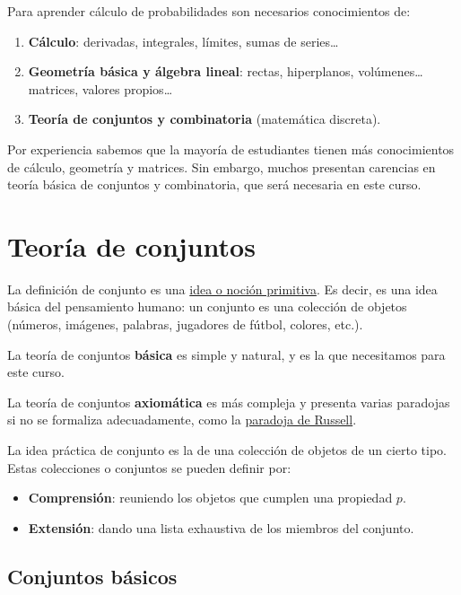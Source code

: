 \documentclass[
  letterpaper,
  DIV=11,
  numbers=noendperiod]{scrreprt}
\providecommand{\tightlist}{%
  \setlength{\itemsep}{0pt}\setlength{\parskip}{0pt}}\usepackage{longtable,booktabs,array}
\begin{document}
Para aprender cálculo de probabilidades son necesarios conocimientos de:

\begin{enumerate}
\def\labelenumi{\arabic{enumi}.}
\tightlist
\item
  \textbf{Cálculo}: derivadas, integrales, límites, sumas de
  series\ldots{}
\item
  \textbf{Geometría básica y álgebra lineal}: rectas, hiperplanos,
  volúmenes\ldots{} matrices, valores propios\ldots{}
\item
  \textbf{Teoría de conjuntos y combinatoria} (matemática discreta).
\end{enumerate}

Por experiencia sabemos que la mayoría de estudiantes tienen más
conocimientos de cálculo, geometría y matrices. Sin embargo, muchos
presentan carencias en teoría básica de conjuntos y combinatoria, que
será necesaria en este curso.

\section{Teoría de conjuntos}\label{teoruxeda-de-conjuntos}

La definición de conjunto es una
\href{https://es.wikipedia.org/wiki/Concepto_primitivo}{idea o noción
primitiva}. Es decir, es una idea básica del pensamiento humano: un
conjunto es una colección de objetos (números, imágenes, palabras,
jugadores de fútbol, colores, etc.).

La teoría de conjuntos \textbf{básica} es simple y natural, y es la que
necesitamos para este curso.

La teoría de conjuntos \textbf{axiomática} es más compleja y presenta
varias paradojas si no se formaliza adecuadamente, como la
\href{https://es.wikipedia.org/wiki/Paradoja_de_Russell}{paradoja de
Russell}.

La idea práctica de conjunto es la de una colección de objetos de un
cierto tipo. Estas colecciones o conjuntos se pueden definir por:

\begin{itemize}
\tightlist
\item
  \textbf{Comprensión}: reuniendo los objetos que cumplen una propiedad
  \(p\).
\item
  \textbf{Extensión}: dando una lista exhaustiva de los miembros del
  conjunto.
\end{itemize}

\subsection{Conjuntos básicos}\label{conjuntos-buxe1sicos}
\end{document}
